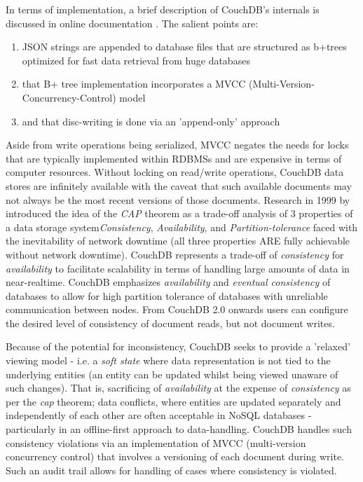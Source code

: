 In terms of implementation, a brief description of CouchDB's internals is discussed in online documentation \cite{couchguide}. The salient points are:

\begin{enumerate}
    \item JSON strings are appended to database files that are structured as b+trees optimized for fast data retrieval from huge databases
    \item that B+ tree implementation incorporates a MVCC (Multi-Version-Concurrency-Control) model
    \item and that disc-writing is done via an 'append-only' approach
\end{enumerate}

Aside from write operations being serialized, MVCC negates the needs for locks that are typically implemented within RDBMSs and are expensive in terms of computer resources. Without locking on read/write operations, CouchDB data stores are infinitely available with the caveat that such available documents may not always be the most recent versions of those documents. Research in 1999 by \cite{cap} introduced the idea of the \textit{CAP} theorem as a trade-off analysis of 3 properties of a data storage system\textit{Consistency}, \textit{Availability}, and \textit{Partition-tolerance} faced with the inevitability of network downtime (all three properties ARE fully achievable without network downtime). CouchDB represents a trade-off of \textit{consistency} for \textit{availability} to facilitate scalability in terms of handling large amounts of data in near-realtime. CouchDB emphasizes \textit{availability} and \textit{eventual consistency} of databases to allow for high partition tolerance of databases with unreliable communication between nodes. From CouchDB 2.0 onwards users can configure the desired level of consistency of document reads, but not document writes.

Because of the potential for inconsistency, CouchDB seeks to provide a 'relaxed' viewing model - i.e. a \textit{soft state} where data representation is not tied to the underlying entities (an entity can be updated whilst being viewed unaware of such changes). That is, sacrificing of \textit{availability} at the expense of \textit{consistency} as per the \textit{cap} theorem; data conflicts, where entities are updated separately and independently of each other are often acceptable in NoSQL databases - particularly in an offline-first approach to data-handling. CouchDB handles such consistency violations via an implementation of MVCC (multi-version concurrency control) that involves a versioning of each document during write. Such an audit trail allows for handling of cases where consistency is violated.


